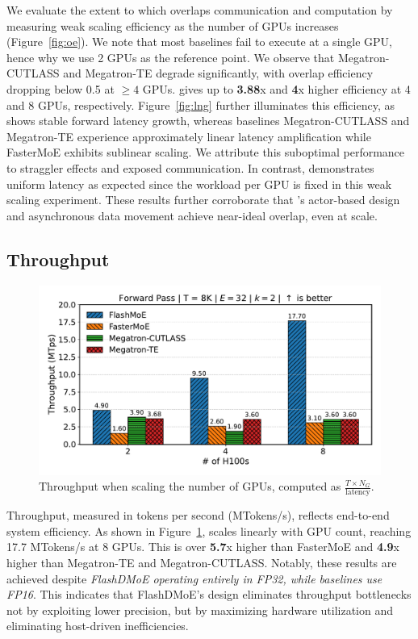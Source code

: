 We evaluate the extent to which \sysname overlaps communication and computation by measuring weak scaling efficiency
as the number of GPUs increases (Figure~\ref{fig:oe}).
We note that most baselines fail to execute at a single GPU, hence why we use 2 GPUs as the reference point.
We observe that Megatron-CUTLASS and Megatron-TE degrade significantly,
with overlap efficiency dropping below 0.5 at $\geq 4$ GPUs. \sysname gives up to \textbf{3.88}x and
\textbf{4}x higher efficiency at 4 and 8 GPUs, respectively.
Figure~\ref{fig:lng} further illuminates this efficiency, as \sysname shows stable forward latency growth,
whereas baselines Megatron-CUTLASS and Megatron-TE experience approximately linear
latency amplification while FasterMoE exhibits sublinear scaling.
We attribute this suboptimal performance to straggler effects and exposed communication.
In contrast, \sysname demonstrates uniform latency as expected since the workload per
GPU is fixed in this weak scaling experiment.
These results further corroborate that \sysname's actor-based design and asynchronous data movement
achieve near-ideal overlap, even at scale.

\subsection{Throughput}\label{subsec:throughput}
\begin{figure}
    \vspace{-15pt}
    \centering
    \includegraphics[width=\linewidth, keepaspectratio]{flash_figs/throughput_8}
    \caption{Throughput when scaling the number of GPUs, computed as $\frac{T \times N_G}{\text{latency}}$.}
    \label{fig:thr}
\end{figure}
Throughput, measured in tokens per second (MTokens/s), reflects end-to-end system efficiency.
As shown in Figure~\ref{fig:thr}, \sysname scales linearly with GPU count, reaching 17.7 MTokens/s at 8 GPUs.
This is over \textbf{5.7}x higher than FasterMoE and \textbf{4.9}x higher than Megatron-TE and Megatron-CUTLASS\@.
Notably, these results are achieved despite \emph{FlashDMoE operating entirely in FP32,
while baselines use FP16}.
This indicates that FlashDMoE’s design eliminates throughput bottlenecks not by
exploiting lower precision, but by maximizing hardware utilization and eliminating host-driven inefficiencies.
